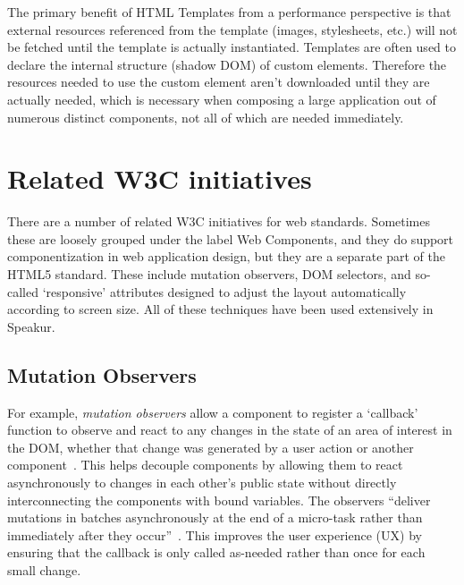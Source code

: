 The primary benefit of HTML Templates from a performance perspective is that external resources referenced from the template (images, stylesheets, etc.) will not be fetched until the template is actually instantiated.
Templates are often used to declare the internal structure (shadow DOM) of custom elements. 
Therefore the resources needed to use the custom element aren't downloaded until they are actually needed, which is necessary when composing a large application out of numerous distinct components, 
not all of which are needed immediately.

\section{Related W3C initiatives}
There are a number of related W3C initiatives for web standards. 
Sometimes these are loosely grouped under the label Web Components,
and they do support componentization in web application design, 
but they are a separate part of the HTML5 standard.
These include mutation observers, 
DOM selectors, 
and so-called `responsive' attributes designed to adjust the layout automatically according to screen size.
All of these techniques have been used extensively in Speakur.

\subsection{Mutation Observers}
\label{sec:bgmutation}
For example, \textit{mutation observers}
allow a component to register a `callback' function to observe and react to any changes in the state of an area of interest in the DOM, 
whether that change was generated by a user action or another 
component~\cite{w3ccontributors2014}.
This helps decouple components by allowing them to react asynchronously to changes in each other's public state without directly interconnecting the components with bound variables.
The observers ``deliver mutations in batches asynchronously at the end of a micro-task rather than immediately after they occur''~\cite{addyosmani2014}.
This improves the user experience (UX) by ensuring that the callback is only called as-needed rather than once for each small change.

